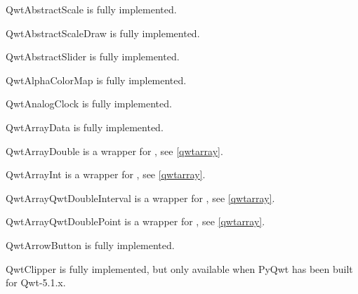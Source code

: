 \documentclass{manual}
\begin{document}
{\begin{classdesc*}{QwtAbstractScale}
  is fully implemented.
\end{classdesc*}

\begin{classdesc*}{QwtAbstractScaleDraw}
  is fully implemented.
\end{classdesc*}

\begin{classdesc*}{QwtAbstractSlider}
  is fully implemented.
\end{classdesc*}

\begin{classdesc*}{QwtAlphaColorMap}
  is fully implemented.
\end{classdesc*}

\begin{classdesc*}{QwtAnalogClock}
  is fully implemented.
\end{classdesc*}

\begin{classdesc*}{QwtArrayData}
  is fully implemented.
\end{classdesc*}

\begin{classdesc*}{QwtArrayDouble}
  is a wrapper for , see \ref{qwtarray}.
\end{classdesc*}

\begin{classdesc*}{QwtArrayInt}
  is a wrapper for , see \ref{qwtarray}.
\end{classdesc*}

\begin{classdesc*}{QwtArrayQwtDoubleInterval}
  is a wrapper for , see \ref{qwtarray}.
\end{classdesc*}

\begin{classdesc*}{QwtArrayQwtDoublePoint}
  is a wrapper for , see \ref{qwtarray}.
\end{classdesc*}

\begin{classdesc*}{QwtArrowButton}
  is fully implemented.
\end{classdesc*}

\begin{classdesc*}{QwtClipper}
  is fully implemented, but only available when PyQwt has been built for
  Qwt-5.1.x.
\end{classdesc*}

}
\end{document}
